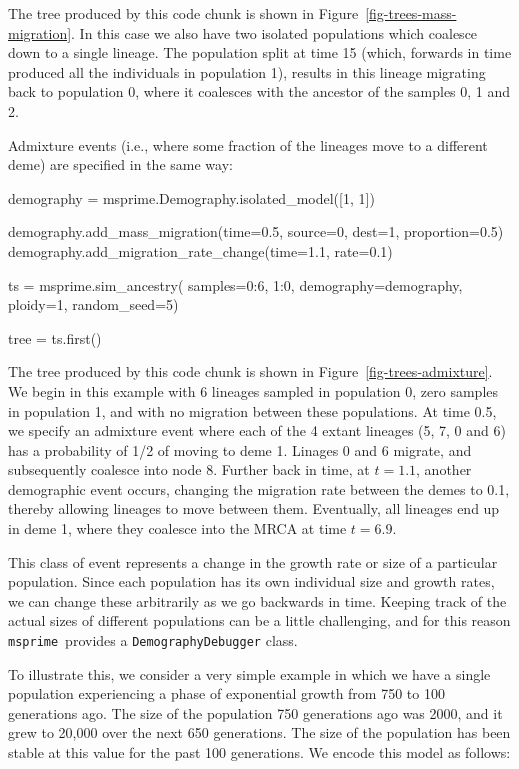 \documentclass[graybox]{svmult}
\newcommand{\msprime}[0]{\texttt{msprime}}
\begin{document}
The tree produced by this code chunk is shown in
Figure~\ref{fig-trees-mass-migration}. In this case we also have two isolated
populations which coalesce down to a single lineage. The population split at
time 15 (which, forwards in time produced all the individuals in population 1),
results in this lineage migrating back to population 0, where it coalesces with
the ancestor of the samples 0, 1 and 2.

Admixture events (i.e., where some fraction of the lineages move to a
different deme) are specified in the same way:

\clearpage
\begin{pythoncode}
demography = msprime.Demography.isolated_model([1, 1])

demography.add_mass_migration(time=0.5, source=0, dest=1, proportion=0.5)
demography.add_migration_rate_change(time=1.1, rate=0.1)

ts  = msprime.sim_ancestry(
    samples={0:6, 1:0},
    demography=demography,
    ploidy=1,
    random_seed=5)

tree = ts.first()
\end{pythoncode}

The tree produced by this code chunk is shown in
Figure~\ref{fig-trees-admixture}.
We begin in this example with 6 lineages sampled in population 0, zero
samples in population 1, and with no migration between these
populations. At time 0.5, we specify an admixture event where each of
the 4 extant lineages (5, 7, 0 and 6) has a probability of 1/2 of moving
to deme 1. Linages 0 and 6 migrate, and subsequently coalesce into node
8. Further back in time, at \(t=1.1\), another demographic event occurs,
changing the migration rate between the demes to 0.1, thereby allowing
lineages to move between them. Eventually, all lineages end up in deme
1, where they coalesce into the MRCA at time \(t=6.9\).

\label{population-parameter-change}

This class of event represents a change in the growth rate or
size of a particular population. Since each population has its own
individual size and growth rates, we can change these arbitrarily as we
go backwards in time. Keeping track of the actual sizes of different
populations can be a little challenging, and for this reason \msprime\
provides a \texttt{DemographyDebugger} class.

To illustrate this, we consider a very simple example in which we have a
single population experiencing a phase of exponential growth from 750
to 100 generations ago. The size of the population 750 generations ago
was 2000, and it grew to 20,000 over the next 650 generations. The size
of the population has been stable at this value for the past 100
generations. We encode this model as follows:
\end{document}
